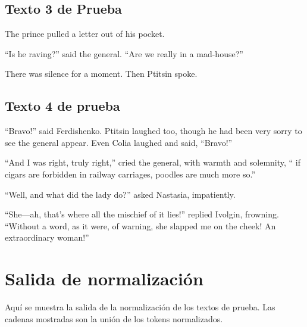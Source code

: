\documentclass[a4paper,twocolumn]{article}
\begin{document}
    \subsection{Texto 3 de Prueba}\label{subsec:texto3}

    The prince pulled a letter out of his pocket.

    ``Is he raving?'' said the general.
    ``Are we really in a mad-house?''

    There was silence for a moment.
    Then Ptitsin spoke.

    \subsection{Texto 4 de prueba}\label{subsec:texto4}

    ``Bravo!'' said Ferdishenko.
    Ptitsin laughed too, though he had been very
    sorry to see the general appear.
    Even Colia laughed and said, ``Bravo!''

    ``And I was right, truly right,'' cried the general, with warmth and
    solemnity, `` if cigars are forbidden in railway carriages, poodles
    are much more so.''

    ``Well, and what did the lady do?'' asked Nastasia, impatiently.

    ``She—ah, that’s where all the mischief of it lies!'' replied Ivolgin, frowning.
    ``Without a word, as it were, of warning, she slapped me on the cheek!
    An extraordinary woman!''

    \newpage

    \section {Salida de normalización}\label{sec:salidanormalizacion}
    Aquí se muestra la salida de la normalización de los textos de prueba.
    Las cadenas mostradas son la unión de los tokens normalizados.
\end{document}

